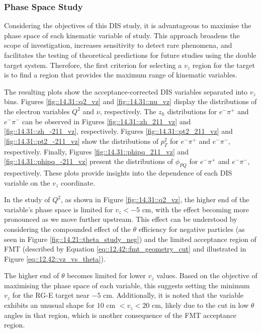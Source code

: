 \subsubsection{Phase Space Study}
\label{14.31::phase_space_study}
    Considering the objectives of this DIS study, it is advantageous to maximise the phase space of each kinematic variable of study.
    This approach broadens the scope of investigation, increases sensitivity to detect rare phenomena, and facilitates the testing of theoretical predictions for future studies using the double target system.
    Therefore, the first criterion for selecting a $v_z$ region for the target is to find a region that provides the maximum range of kinematic variables.

    The resulting plots show the acceptance-corrected DIS variables separated into $v_z$ bins.
    Figures \ref{fig::14.31::q2_vz} and \ref{fig::14.31::nu_vz} display the distributions of the electron variables $Q^2$ and $\nu$, respectively.
    The $z_h$ distributions for $e^-\pi^+$ and $e^-\pi^-$ can be observed in Figures \ref{fig::14.31::zh_211_vz} and \ref{fig::14.31::zh_-211_vz}, respectively.
    Figures \ref{fig::14.31::pt2_211_vz} and \ref{fig::14.31::pt2_-211_vz} show the distributions of $p_T^2$ for $e^-\pi^+$ and $e^-\pi^-$, respectively.
    Finally, Figures \ref{fig::14.31::phipq_211_vz} and \ref{fig::14.31::phipq_-211_vz} present the distributions of $\phi_{PQ}$ for $e^-\pi^+$ and $e^-\pi^-$, respectively.
    These plots provide insights into the dependence of each DIS variable on the $v_z$ coordinate.

    In the study of $Q^2$, as shown in Figure \ref{fig::14.31::q2_vz}, the higher end of the variable's phase space is limited for $v_z < -5$ cm, with the effect becoming more pronounced as we move further upstream.
    This effect can be understood by considering the compounded effect of the $\theta$ efficiency for negative particles (as seen in Figure \ref{fig::14.21::theta_study_neg}) and the limited acceptance region of FMT (described by Equation \eqref{eq::12.42::fmt_geometry_cut} and illustrated in Figure \ref{eq::12.42::vz_vs_theta}).

    The higher end of $\theta$ becomes limited for lower $v_z$ values.
    Based on the objective of maximising the phase space of each variable, this suggests setting the minimum $v_z$ for the RG-E target near $-5$ cm.
    Additionally, it is noted that the variable exhibits an unusual shape for $10$ cm $< v_z < 20$ cm, likely due to the cut in low $\theta$ angles in that region, which is another consequence of the FMT acceptance region.

